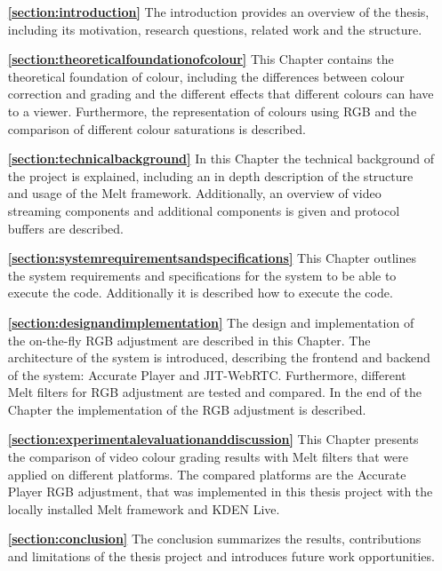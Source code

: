 \documentclass[../MasterThesis.tex]{subfiles}
\begin{document}
	
	\begin{itemize}
		
		\item[\textbf{\ref{section:introduction}}] The introduction provides an overview of the thesis, including its motivation, research questions, related work and the structure.
		
		\item[\textbf{\ref{section:theoreticalfoundationofcolour}}] This Chapter contains the theoretical foundation of colour, including the differences between colour correction and grading and the  different effects that different colours can have to a viewer. Furthermore, the representation of colours using RGB and the comparison of different colour saturations is described.
		
		\item[\textbf{\ref{section:technicalbackground}}] In this Chapter the technical background of the project is explained, including an in depth description of the structure and usage of the Melt framework. Additionally, an overview of video streaming components and additional components is given and protocol buffers are described.
		
		\item[\textbf{\ref{section:systemrequirementsandspecifications}}] This Chapter outlines the system requirements and specifications for the system to be able to execute the code. Additionally it is described how to execute the code.
		
		\item[\textbf{\ref{section:designandimplementation}}] The design and implementation of the on-the-fly RGB adjustment are described in this Chapter. The architecture of the system is introduced, describing the frontend and backend of the system: Accurate Player and JIT-WebRTC. Furthermore, different Melt filters for RGB adjustment are tested and compared. In the end of the Chapter the implementation of the RGB adjustment is described.
		
		\item[\textbf{\ref{section:experimentalevaluationanddiscussion}}] This Chapter presents the comparison of video colour grading results with Melt filters that were applied on different platforms. The compared platforms are the Accurate Player RGB adjustment, that was implemented in this thesis project with the locally installed Melt framework and KDEN Live.
		
		\item[\textbf{\ref{section:conclusion}}] The conclusion summarizes the results, contributions and limitations of the thesis project and introduces future work opportunities.
		
	\end{itemize}

	
	
	

	
	

	
	
	
\end{document}
